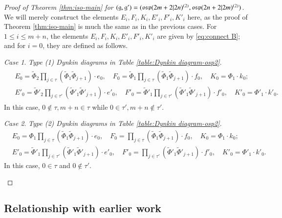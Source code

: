 \documentclass[12pt]{amsart}
\theoremstyle{definition}
\theoremstyle{remark}
\numberwithin{equation}{section}
\newtheorem{case}{Case}
\begin{document}
\begin{proof}[Proof of Theorem \ref{thm:iso-main}  for $({{\mathfrak g}}, {{\mathfrak g}}')=
 ({{\rm\mathfrak{osp}}}(2m+2|2n)^{(2)}, {{\rm\mathfrak{osp}}}(2n+2|2m)^{(2)})$]
We will merely construct the elements $E_i, F_i, K_i, E'_i, F'_i, K'_i$ here, as
the proof of Theorem \ref{thm:iso-main} is much the same as in the previous  cases.
For $1\leq i\leq m+n$, the elements $E_i, F_i, K_i, E'_i, F'_i, K'_i$ are given by
\eqref{eq:connect B}; and for $i=0$, they are defined as follows.
\begin{case}
{\em Type (1) Dynkin diagrams in Table \ref{table:Dynkin diagram-osp2}}.
\begin{eqnarray}\label{eq:connect D-case1}
\begin{aligned}
&E_0=\tilde{\Phi}_2\prod_{j\in\tau}(\tilde{\Phi}_1\tilde{\Phi}_{j+1})\cdot e_0,\quad F_0=\tilde{\Phi}_1\prod_{j\in\tau}(\tilde{\Phi}_1\tilde{\Phi}_{j+1})\cdot f_0,\quad K_0=\Phi_1\cdot k_0;\\
&E'_0=\tilde{\Phi}'_2\prod_{j\in\tau'}(\tilde{\Phi}'_1\tilde{\Phi}'_{j+1})\cdot e'_0,\quad F'_0= \tilde{\Phi}'_1\prod_{j\in\tau'}(\tilde{\Phi}'_1\tilde{\Phi}'_{j+1})\cdot f'_0, \quad K'_0=\Phi'_1\cdot k'_0.
\end{aligned}
\end{eqnarray}
In this case, $0\notin\tau, m+n\in\tau$ while $0\in\tau', m+n\notin\tau'$.
\end{case}

\begin{case}
{\em Type (2) Dynkin diagrams in Table \ref{table:Dynkin diagram-osp2}}.
\begin{equation}\label{eq:connect D-case2}
\begin{aligned}
&E_0=\Phi_1\prod_{j\in\tau}(\tilde{\Phi}_1\tilde{\Phi}_{j+1})\cdot e_0,\quad F_0=\prod_{j\in\tau}(\tilde{\Phi}_1\tilde{\Phi}_{j+1})\cdot f_0,\quad K_0=\Phi_1\cdot k_0;\\
&E'_0=\tilde{\Phi}'_1\prod_{j\in\tau'}(\tilde{\Phi}'_1\tilde{\Phi}'_{j+1})\cdot e'_0,\quad F'_0=\prod_{j\in\tau'}(\tilde{\Phi}'_1\tilde{\Phi}'_{j+1})\cdot f'_0,\quad K'_0=\Phi'_1\cdot k'_0.
\end{aligned}
\end{equation}
In this case, $0\in\tau$ and $0\notin\tau'$.
\end{case}
\end{proof}

\subsection{Relationship with earlier work}\label{remk:nonisotropic} 
\end{document}

